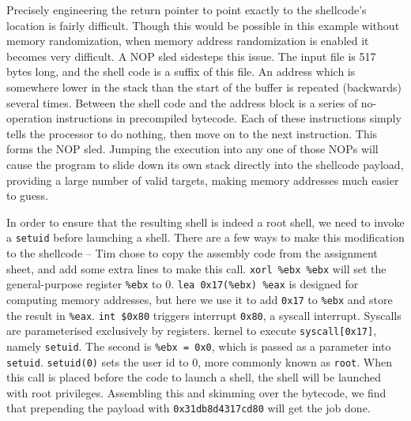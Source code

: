 Precisely engineering the return pointer to point exactly to the shellcode's location is fairly difficult. Though this
would be possible in this example without memory randomization, when memory address randomization is enabled it becomes
very difficult. A NOP sled sidesteps this issue. The input file is 517 bytes long, and the shell code is a suffix of
this file. An address which is somewhere lower in the stack than the start of the buffer is repeated (backwards) several
times. Between the shell code and the address block is a series of no-operation instructions in precompiled bytecode.
Each of these instructions simply tells the processor to do nothing, then move on to the next instruction. This forms
the NOP sled. Jumping the execution into any one of those NOPs will cause the program to slide down its own stack
directly into the shellcode payload, providing a large number of valid targets, making memory addresses much easier to
guess.

In order to ensure that the resulting shell is indeed a root shell, we need to invoke a {\tt setuid} before launching a
shell. There are a few ways to make this modification to the shellcode -- Tim chose to copy the assembly code from the
assignment sheet, and add some extra lines to make this call. {\tt xorl \%ebx \%ebx} will set the general-purpose
register {\tt \%ebx} to 0. {\tt lea 0x17(\%ebx) \%eax} is designed for computing memory addresses, but here we use it to
add {\tt 0x17} to {\tt \%ebx} and store the result in {\tt \%eax}. {\tt int \$0x80} triggers interrupt {\tt 0x80}, a
syscall interrupt. Syscalls are parameterised exclusively by
registers.%
kernel to execute {\tt syscall[0x17]}, namely {\tt setuid}. The second is {\tt \%ebx = 0x0}, which is passed as a
parameter into {\tt setuid}. {\tt setuid(0)} sets the user id to 0, more commonly known as {\tt root}. When this call is
placed before the code to launch a shell, the shell will be launched with root privileges. Assembling this and skimming
over the bytecode, we find that prepending the payload with {\tt 0x31db8d4317cd80} will get the job done.
